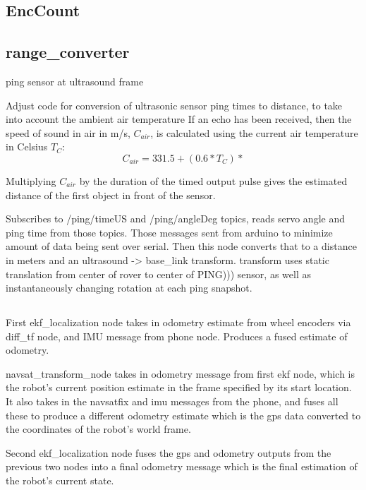 \subsection{EncCount} \label{sectionEncCount}

\subsection{range\_converter}
ping sensor at ultrasound frame

Adjust code for conversion of ultrasonic sensor ping times to distance, to take into account the ambient air temperature
If an echo has been received, then the speed of sound in air in m/s, \(C_{air}\), is calculated using the current air temperature in Celsius \(T_C\):
\[C_{air} = 331.5 + (0.6 * T_C)*\]

Multiplying \(C_{air}\) by the duration of the timed output pulse gives the estimated distance of the first object in front of the sensor.

Subscribes to /ping/timeUS and /ping/angleDeg topics, reads servo angle and ping time from those topics. Those messages sent from arduino to minimize amount of data being sent over serial. Then this node converts that to a distance in meters and an ultrasound -> base\_link transform. transform uses static translation from center of rover to center of PING))) sensor, as well as instantaneously changing rotation at each ping snapshot.

\subsection{}
First ekf\_localization node takes in odometry estimate from wheel encoders via diff\_tf node, and IMU message from phone node. Produces a fused estimate of odometry.

navsat\_transform\_node takes in odometry message from first ekf node, which is the robot’s current position estimate in the frame specified by its start location. It also takes in the navsatfix and imu messages from the phone, and fuses all these to produce a different odometry estimate which is the gps data converted to the coordinates of the robot's world frame.

Second ekf\_localization node fuses the gps and odometry outputs from the previous two nodes into a final odometry message which is the final estimation of the robot's current state.


\cite{robot_localization_paper}
